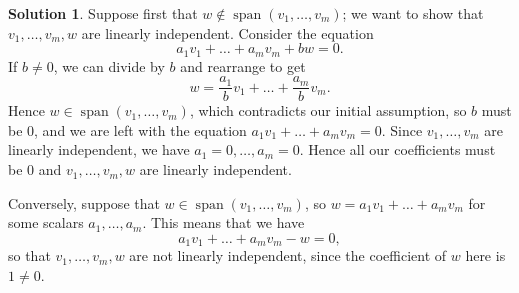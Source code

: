 \documentclass[12pt]{article}
\theoremstyle{definition}
\theoremstyle{definition}
\newtheorem*{soln}{Solution}
\newcommand{\Span}{\operatorname{span}}
\begin{document}
\begin{soln}
Suppose first that $w\notin\Span(v_1,\ldots,v_m)$; we want to show that $v_1,\ldots,v_m,w$ are linearly independent. Consider the equation
\[a_1v_1+\dots+a_mv_m+bw=0.\]
If $b\neq 0$, we can divide by $b$ and rearrange to get
\[w=\frac{a_1}{b}v_1+\dots+\frac{a_m}{b}v_m.\]
Hence $w\in\Span(v_1,\ldots,v_m)$, which contradicts our initial assumption, so $b$ must be $0$, and we are left with the equation $a_1v_1+\dots+a_mv_m=0$. Since $v_1,\dots,v_m$ are linearly independent, we have $a_1=0,\dots,a_m=0$. Hence all our coefficients must be $0$ and $v_1,\ldots,v_m, w$ are linearly independent.

Conversely, suppose that $w\in\Span(v_1,\ldots,v_m)$, so $w=a_1v_1+\dots+a_mv_m$ for some scalars $a_1,\dots,a_m$. This means that we have
\[a_1v_1+\dots+a_mv_m-w=0,\]
so that $v_1,\ldots,v_m, w$ are not linearly independent, since the coefficient of $w$ here is $1\neq 0$.
\end{soln}
\end{document}
